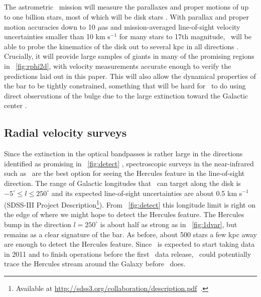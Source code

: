 \subsection{\Gaia}

The astrometric \Gaia\ mission will measure the parallaxes and proper
motions of up to one billion stars, most of which will be disk stars
\citep{2001A&A...369..339P}. With parallax and proper motion
accuracies down to 10 $\mu$as and mission-averaged line-of-sight
velocity uncertainties smaller than 10 km s$^{-1}$ for many stars to
17th magnitude, \Gaia\ will be able to probe the kinematics of the
disk out to several kpc in all directions
\citep{Katz04a,bailerjones08a}. Crucially, it will provide large
samples of giants in many of the promising regions in
\figurename~\ref{fig:rphi2d}, with velocity measurements accurate
enough to verify the predictions laid out in this paper. This will
also allow the dynamical properties of the bar to be tightly
constrained, something that will be hard for \Gaia\ to do using direct
observations of the bulge due to the large extinction toward the
Galactic center \citep{robin05a}.


\subsection{Radial velocity surveys}

Since the extinction in the optical bandpasses is rather large in the
directions identified as promising in \figurename~\ref{fig:detect}
\citep[$A_V \approx 8$ mag toward $l \approx
  270^{\circ}$;][]{marshall06a}, spectroscopic surveys in the
near-infrared such as \apogee\ are the best option for seeing the
Hercules feature in the line-of-sight direction. The range of Galactic
longitudes that \apogee\ can target along the disk is $-5^{\circ} \leq
l \leq 250^{\circ}$ and its expected line-of-sight uncertainties are
about 0.5 km s$^{-1}$ (SDSS-III Project Description\footnote{Available
  at \url{http://sdss3.org/collaboration/description.pdf}~.}). From
\figurename~\ref{fig:detect} this longitude limit is right on the edge
of where we might hope to detect the Hercules feature. The Hercules
bump in the direction $l = 250^{\circ}$ is about half as strong as in
\figurename~\ref{fig:1dvar}, but remains as a clear signature of the
bar. As before, about 500 stars a few kpc away are enough to detect
the Hercules feature. Since \apogee\ is expected to start taking data
in 2011 and to finish operations before the first \Gaia\ data release,
\apogee\ could potentially trace the Hercules stream around the Galaxy
before \Gaia\ does.


